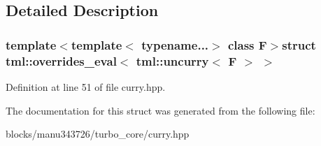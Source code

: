 \subsection{Detailed Description}
\subsubsection*{template$<$template$<$ typename...$>$ class F$>$struct tml\+::overrides\+\_\+eval$<$ tml\+::uncurry$<$ F $>$ $>$}



Definition at line 51 of file curry.\+hpp.



The documentation for this struct was generated from the following file\+:\begin{DoxyCompactItemize}
\item 
blocks/manu343726/turbo\+\_\+core/curry.\+hpp\end{DoxyCompactItemize}
